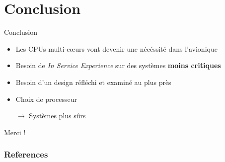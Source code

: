 \documentclass{beamer}
\begin{document}
\section{Conclusion}

\begin{frame}{Conclusion}
	\begin{itemize}
		\item Les CPUs multi-cœurs vont devenir une nécéssité dans l'avionique\pause
		\item Besoin de \textit{In Service Experience} sur des systèmes \textbf{moins
			critiques}\pause
		\item Besoin d'un design réfléchi et examiné au plus près \pause
		\item Choix de processeur\pause
		\item[$\rightarrow$] Systèmes plus sûrs\pause
	\end{itemize}

	\begin{center}
		\textcolor{polymtlred}{Merci !}
	\end{center}
\end{frame}

\begin{frame}[allowframebreaks]
        \frametitle{References}
        
        
\end{frame}
\end{document}

